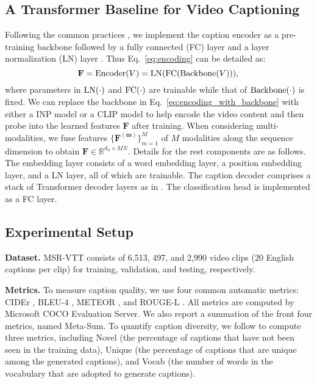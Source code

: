 \documentclass[runningheads]{llncs}
\begin{document}
\subsection{A Transformer Baseline for Video Captioning}
\label{sec:transformer_baseline}
Following the common practices \cite{zhang2021open,zhang2020object}, we implement the caption encoder as a pre-training backbone followed by a fully connected (FC) layer and a layer normalization (LN) layer \cite{ba2016layer}. Thus Eq.~\ref{eq:encoding} can be detailed as:
\begin{equation}
\label{eq:encoding_with_backbone}
   \mathbf{F} = {\rm Encoder}(V) = {\rm LN}({\rm FC}({\rm Backbone}(V))),
\end{equation}
where parameters in ${\rm LN}(\cdot)$ and ${\rm FC}(\cdot)$ are trainable while that of ${\rm Backbone(\cdot)}$ is fixed. We can replace the backbone in Eq.~\ref{eq:encoding_with_backbone} with either a INP model or a CLIP model to help encode the video content and then probe into the learned features $\mathbf{F}$ after training. When considering multi-modalities, we fuse features $\{\mathbf{F^{(m)}}\}_{m=1}^{M}$ of $M$ modalities along the sequence dimension to obtain $\mathbf{F} \in \mathbb{R}^{d_h\times MN}$. Details for the rest components are as follows. The embedding layer consists of a word embedding layer, a position embedding layer, and a LN layer, all of which are trainable. The caption decoder comprises a stack of Transformer decoder layers as in \cite{vaswani2017attention}. The classification head is implemented as a FC layer. 


\subsection{Experimental Setup}
\label{sec:AL_experimental_setup}

\noindent\textbf{Dataset.} MSR-VTT\cite{xu2016msr} consists of 6,513, 497, and 2,990 video clips (20 English captions per clip) for training, validation, and testing, respectively.

\noindent\textbf{Metrics.} To measure caption quality, we use four common automatic metrics: CIDEr \cite{vedantam2015cider}, BLEU-4 \cite{papineni2002bleu}, METEOR \cite{banerjee2005meteor}, and ROUGE-L \cite{lin2004rouge}. All metrics are computed by Microsoft COCO Evaluation Server. We also report a summation of the front four metrics, named Meta-Sum. To quantify caption diversity, we follow \cite{yang2021non} to compute three metrics, including Novel (the percentage of captions that have not been seen in the training data), Unique (the percentage of captions that are unique among the generated captions), and Vocab (the number of words in the vocabulary that are adopted to generate captions). 
\end{document}
